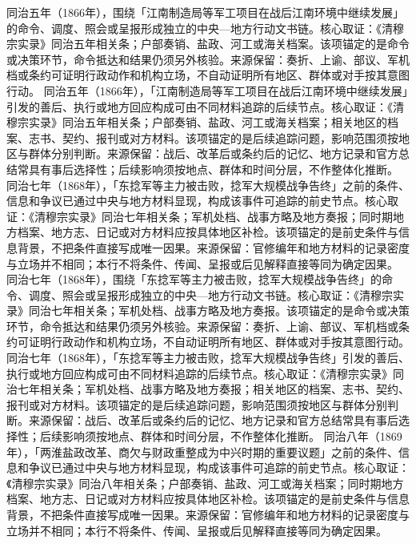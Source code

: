 同治五年（1866年），围绕「江南制造局等军工项目在战后江南环境中继续发展」的命令、调度、照会或呈报形成独立的中央—地方行动文书链。核心取证：《清穆宗实录》同治五年相关条；户部奏销、盐政、河工或海关档案。该项锚定的是命令或决策环节，命令抵达和结果仍须另外核验。来源保留：奏折、上谕、部议、军机档或条约可证明行政动作和机构立场，不自动证明所有地区、群体或对手按其意图行动。
同治五年（1866年），「江南制造局等军工项目在战后江南环境中继续发展」引发的善后、执行或地方回应构成可由不同材料追踪的后续节点。核心取证：《清穆宗实录》同治五年相关条；户部奏销、盐政、河工或海关档案；相关地区的档案、志书、契约、报刊或对方材料。该项锚定的是后续追踪问题，影响范围须按地区与群体分别判断。来源保留：战后、改革后或条约后的记忆、地方记录和官方总结常具有事后选择性；后续影响须按地点、群体和时间分层，不作整体化推断。
同治七年（1868年），「东捻军等主力被击败，捻军大规模战争告终」之前的条件、信息和争议已通过中央与地方材料显现，构成该事件可追踪的前史节点。核心取证：《清穆宗实录》同治七年相关条；军机处档、战事方略及地方奏报；同时期地方档案、地方志、日记或对方材料应按具体地区补检。该项锚定的是前史条件与信息背景，不把条件直接写成唯一因果。来源保留：官修编年和地方材料的记录密度与立场并不相同；本行不将条件、传闻、呈报或后见解释直接等同为确定因果。
同治七年（1868年），围绕「东捻军等主力被击败，捻军大规模战争告终」的命令、调度、照会或呈报形成独立的中央—地方行动文书链。核心取证：《清穆宗实录》同治七年相关条；军机处档、战事方略及地方奏报。该项锚定的是命令或决策环节，命令抵达和结果仍须另外核验。来源保留：奏折、上谕、部议、军机档或条约可证明行政动作和机构立场，不自动证明所有地区、群体或对手按其意图行动。
同治七年（1868年），「东捻军等主力被击败，捻军大规模战争告终」引发的善后、执行或地方回应构成可由不同材料追踪的后续节点。核心取证：《清穆宗实录》同治七年相关条；军机处档、战事方略及地方奏报；相关地区的档案、志书、契约、报刊或对方材料。该项锚定的是后续追踪问题，影响范围须按地区与群体分别判断。来源保留：战后、改革后或条约后的记忆、地方记录和官方总结常具有事后选择性；后续影响须按地点、群体和时间分层，不作整体化推断。
同治八年（1869年），「两淮盐政改革、商欠与财政重整成为中兴时期的重要议题」之前的条件、信息和争议已通过中央与地方材料显现，构成该事件可追踪的前史节点。核心取证：《清穆宗实录》同治八年相关条；户部奏销、盐政、河工或海关档案；同时期地方档案、地方志、日记或对方材料应按具体地区补检。该项锚定的是前史条件与信息背景，不把条件直接写成唯一因果。来源保留：官修编年和地方材料的记录密度与立场并不相同；本行不将条件、传闻、呈报或后见解释直接等同为确定因果。
